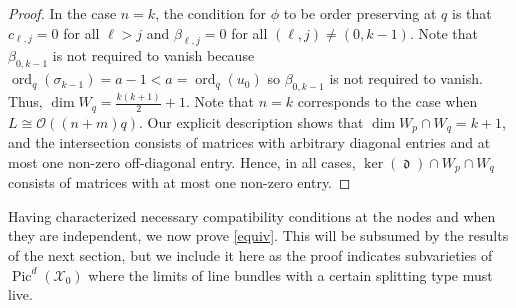 \documentclass[12pt]{amsart}
\newcommand{\X}{\mathcal{X}}
\renewcommand{\O}{\mathscr{O}}
\DeclareMathOperator{\Pic}{Pic}
\DeclareMathOperator{\ord}{ord}
\DeclareMathOperator{\diag}{\mathfrak{d}}
\theoremstyle{definition}
\theoremstyle{remark}
\theoremstyle{remark}
\numberwithin{equation}{section}
\begin{document}
\begin{proof}
In the case $n=k$, the condition for $\phi$ to be order preserving at $q$ is that $c_{\ell,j} = 0$ for all $\ell > j$  and $\beta_{\ell, j} = 0$ for all $(\ell, j) \neq (0, k-1)$. Note that $\beta_{0, k-1}$ is not required to vanish because $\ord_q(\sigma_{k-1}) = a-1 < a = \ord_q(u_0)$ so $\beta_{0, k-1}$ is not required to vanish. Thus, $\dim W_q =\frac{k(k+1)}{2}+1$. Note that $n = k$ corresponds to the case when $L \cong \O((n+m)q)$.
Our explicit description shows that $\dim W_p \cap W_q = k+1$, and the intersection consists of matrices with arbitrary diagonal entries and at most one non-zero off-diagonal entry. Hence, in all cases, $\ker(\diag) \cap W_p \cap W_q$ consists of matrices with at most one non-zero entry.
   \end{proof}

Having characterized necessary compatibility conditions at the nodes and when they are independent,
we now prove \eqref{equiv}. This will be subsumed by the results of the next section, but we include it here as the proof indicates subvarieties of $\Pic^d(\X_0)$ where the limits of line bundles with a certain splitting type must live.
\end{document}
